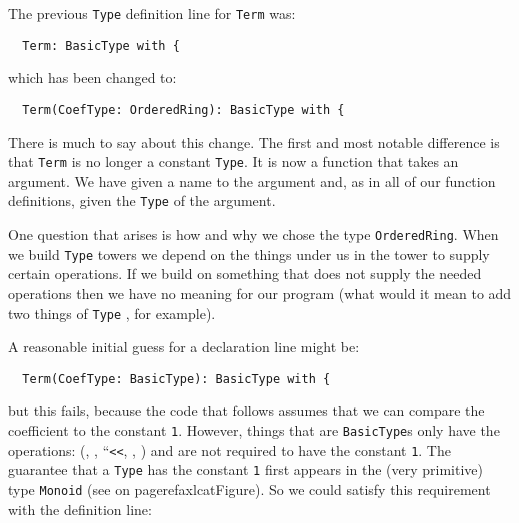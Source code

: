The previous \verb"Type" definition line for \verb"Term" was:

\begin{small}
\begin{verbatim}
  Term: BasicType with {
\end{verbatim}
\end{small}

which has been changed to:

\begin{small}
\begin{verbatim}
  Term(CoefType: OrderedRing): BasicType with {          
\end{verbatim}
\end{small}

There is much to say about this change. The first and most notable
difference is that \verb"Term" is no longer a constant \verb"Type". It is now a
function that takes an argument. We have given a name to the argument
and, as in all of our function definitions, given the \verb"Type" of the
argument.

One question that arises is how and why we chose the type \verb"OrderedRing".
When we build \verb"Type" towers we depend on the things under us in the
tower to supply certain operations. If we build on something that
does not supply the needed operations then we have no meaning for
our program (what would it mean to add two things of \verb"Type" 
, for example).

\goodbreak
A reasonable initial guess for a declaration line might be:

\begin{small}
\begin{verbatim}
  Term(CoefType: BasicType): BasicType with {          
\end{verbatim}
\end{small}

but this fails, because the code that follows assumes that we can
compare the coefficient to the constant \verb"1". However, things that
are \verb"BasicType"s only have the operations: (\ttin{=}, \ttin{\~{}=},
``\verb"<<", , ) and are not required to have
the constant \verb"1".  The guarantee that a \verb"Type" has the
constant \verb"1" first appears in the (very primitive)
type \verb"Monoid" (see  on pageref{axlcatFigure}).
So we could satisfy this requirement with the definition line:

